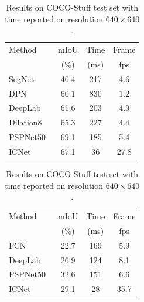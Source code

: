 \documentclass[runningheads]{llncs}
\begin{document}
\begin{table}[bpt]
	\begin{minipage}[t]{0.49\linewidth}
		\centering
		\caption{Results on CamVid test set with time reported on resolution $720 \times 960$.}
		\setlength{\tabcolsep}{5pt}
		\label{tab:camvid}
		\scriptsize
		\begin{tabular}{l | c c c}
			\toprule[1pt]
			Method & mIoU & Time & Frame \\
			& (\%) & (ms) & {fps} \\
			\hline
			\hline
			SegNet~\cite{badrinarayanan2015segnet} & 46.4 & 217 & 4.6 \\
			DPN~\cite{liu2015semantic} & 60.1 & 830 & 1.2 \\
			DeepLab~\cite{chen2015semantic} & 61.6 & 203 & 4.9 \\
			Dilation8~\cite{yu2016multi} & 65.3 & 227 & 4.4 \\
			PSPNet50~\cite{zhao2017pspnet} & 69.1 & 185 & 5.4 \\
			\hline
			\hline
			\rowcolor{Gray}
			ICNet & 67.1 & 36 & 27.8 \\
			\bottomrule[1pt]
		\end{tabular}
		
	\end{minipage}
	\hfill
	\begin{minipage}[t]{0.49\linewidth}
		\centering
		\caption{Results on COCO-Stuff test set with time reported on resolution $640 \times 640$.}
		\setlength{\tabcolsep}{5pt}
		\label{tab:cocostuff}
		\scriptsize
		\begin{tabular}{l | c c c}
			\toprule[1pt]
			Method & mIoU & Time & Frame \\
			& (\%) & (ms) & {fps} \\
			\hline
			\hline
			FCN~\cite{long2015fully} & 22.7 & 169 & 5.9 \\
			DeepLab~\cite{chen2015semantic} & 26.9 & 124 & 8.1 \\
			PSPNet50~\cite{zhao2017pspnet} & 32.6 & 151 & 6.6 \\
			\hline
			\hline
			\rowcolor{Gray}
			ICNet & 29.1 & 28 & 35.7 \\
			\bottomrule[1pt]
		\end{tabular}
	\end{minipage}
\end{table}

\end{document}
